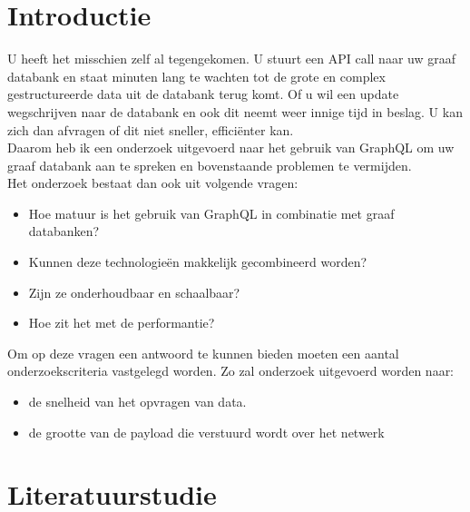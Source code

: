 
\section{Introductie} %
\label{sec:introductie}
U heeft het misschien zelf al tegengekomen. U stuurt een API call naar uw graaf databank en staat minuten lang te wachten tot de grote en complex gestructureerde data uit de databank terug komt. Of u wil een update wegschrijven naar de databank en ook dit neemt weer innige tijd in beslag. U kan zich dan afvragen of dit niet sneller, efficiënter kan.\\
Daarom heb ik een onderzoek uitgevoerd naar het gebruik van GraphQL om uw graaf databank aan te spreken en bovenstaande problemen te vermijden.\\
Het onderzoek bestaat dan ook uit volgende vragen:
\begin{itemize}
	\item Hoe matuur is het gebruik van GraphQL in combinatie met graaf databanken? 
	\item Kunnen deze technologieën makkelijk gecombineerd worden?
	\item Zijn ze onderhoudbaar en schaalbaar?
	\item Hoe zit het met de performantie?
\end{itemize}

Om op deze vragen een antwoord te kunnen bieden moeten een aantal onderzoekscriteria vastgelegd worden. Zo zal onderzoek uitgevoerd worden naar:
\begin{itemize}
	\item de snelheid van het opvragen van data.
	\item de grootte van de payload die verstuurd wordt over het netwerk
\end{itemize}




\section{Literatuurstudie}
\label{sec:literatuurstudie}

